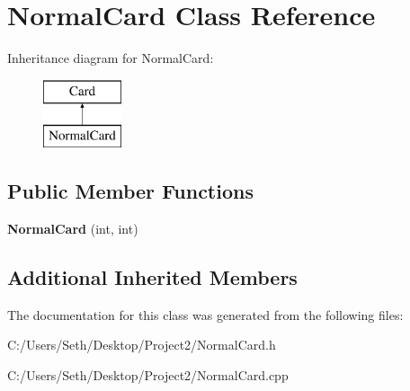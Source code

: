 \hypertarget{class_normal_card}{}\section{Normal\+Card Class Reference}
\label{class_normal_card}
Inheritance diagram for Normal\+Card\+:\begin{figure}[H]
\begin{center}
\leavevmode
\includegraphics[height=2.000000cm]{class_normal_card}
\end{center}
\end{figure}
\subsection*{Public Member Functions}
\begin{DoxyCompactItemize}
\item 
\mbox{\label{class_normal_card_afd7a293c0a5799f0bb4c336151e1f53e}} 
{\bfseries Normal\+Card} (int, int)
\end{DoxyCompactItemize}
\subsection*{Additional Inherited Members}


The documentation for this class was generated from the following files\+:\begin{DoxyCompactItemize}
\item 
C\+:/\+Users/\+Seth/\+Desktop/\+Project2/Normal\+Card.\+h\item 
C\+:/\+Users/\+Seth/\+Desktop/\+Project2/Normal\+Card.\+cpp\end{DoxyCompactItemize}
